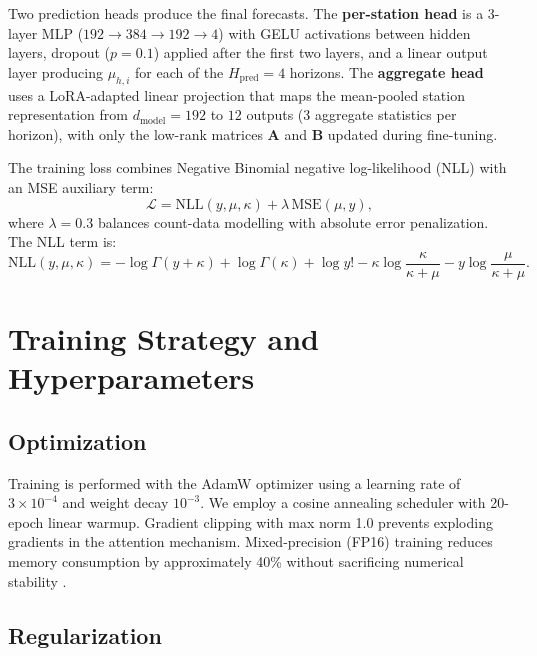 Two prediction heads produce the final forecasts. The \textbf{per-station head} is a 3-layer MLP ($192 \to 384 \to 192 \to 4$) with GELU activations between hidden layers, dropout ($p = 0.1$) applied after the first two layers, and a linear output layer producing $\mu_{h,i}$ for each of the $H_{\text{pred}} = 4$ horizons. The \textbf{aggregate head} uses a LoRA-adapted linear projection that maps the mean-pooled station representation from $d_{\text{model}} = 192$ to $12$ outputs (3 aggregate statistics per horizon), with only the low-rank matrices $\mathbf{A}$ and $\mathbf{B}$ updated during fine-tuning.

The training loss combines Negative Binomial negative log-likelihood (NLL) with an MSE auxiliary term:
\begin{equation}
    \mathcal{L} = \text{NLL}(y, \mu, \kappa) + \lambda \, \text{MSE}(\mu, y),
    \label{eq:loss}
\end{equation}
where $\lambda = 0.3$ balances count-data modelling with absolute error penalization. The NLL term is:
\begin{equation}
    \text{NLL}(y, \mu, \kappa) = -\log \Gamma(y + \kappa) + \log \Gamma(\kappa) + \log y! - \kappa \log\frac{\kappa}{\kappa + \mu} - y \log\frac{\mu}{\kappa + \mu}.
    \label{eq:nll}
\end{equation}

\section{Training Strategy and Hyperparameters}
\label{sec:training}

\subsection{Optimization}

Training is performed with the AdamW optimizer \cite{loshchilov2019decoupled} using a learning rate of $3 \times 10^{-4}$ and weight decay $10^{-3}$. We employ a cosine annealing scheduler with 20-epoch linear warmup. Gradient clipping with max norm 1.0 prevents exploding gradients in the attention mechanism. Mixed-precision (FP16) training reduces memory consumption by approximately 40\% without sacrificing numerical stability \cite{paszke2019pytorch}.

\subsection{Regularization}

